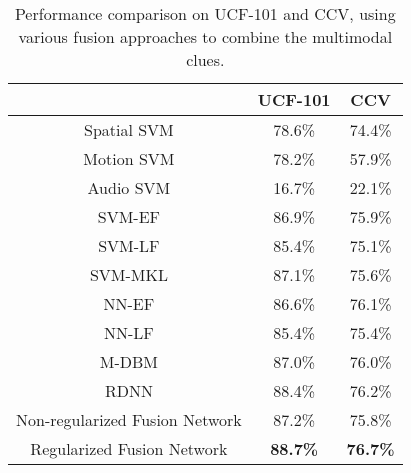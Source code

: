 \documentclass[journal]{IEEEtran}
\begin{document}
\begin{table}[t]
\begin{center}
\caption{\label{tbl:fusion} Performance comparison on UCF-101 and CCV, using various fusion approaches to combine the multimodal clues. }
\begin{tabular}{|c||c|c|}
\hline
            & UCF-101      & CCV                              \\ \hline\hline

 
Spatial SVM   & 78.6\%          & 74.4\%                          \\ 
Motion SVM      & 78.2\%          & 57.9\%                          \\ %
Audio SVM 		& 16.7\% 		& 22.1\%		\\
\hline\hline

SVM-EF            & 86.9\%          & 75.9\%                          \\ 
SVM-LF            & 85.4\%          & 75.1\%                          \\  
SVM-MKL           & 87.1\%          & 75.6\%                          \\ \hline  \hline
NN-EF             & 86.6\%          & 76.1\%                          \\ 
NN-LF             & 85.4\%          & 75.4\%                          \\ 
M-DBM             & 87.0\%          & 76.0\%                          \\ 
RDNN    & 88.4\%        & 76.2\%              \\ \hline \hline

Non-regularized Fusion Network          
          & 87.2\%      & 75.8\%              \\ 
Regularized Fusion Network
          & {\bf 88.7\% }   & {\bf 76.7\% }             \\ \hline
\end{tabular}
\end{center}
\end{table}
\end{document}

